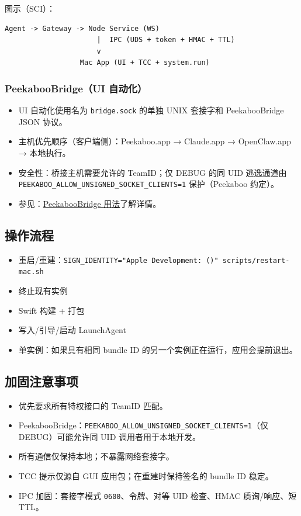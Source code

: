 图示（SCI）：

\begin{lstlisting}
Agent -> Gateway -> Node Service (WS)
                      |  IPC (UDS + token + HMAC + TTL)
                      v
                  Mac App (UI + TCC + system.run)
\end{lstlisting}


\subsubsection{PeekabooBridge（UI 自动化）}


\begin{itemize}
  \item UI 自动化使用名为 \texttt{bridge.sock} 的单独 UNIX 套接字和 PeekabooBridge JSON 协议。
  \item 主机优先顺序（客户端侧）：Peekaboo.app → Claude.app → OpenClaw.app → 本地执行。
  \item 安全性：桥接主机需要允许的 TeamID；仅 DEBUG 的同 UID 逃逸通道由 \texttt{PEEKABOO\_ALLOW\_UNSIGNED\_SOCKET\_CLIENTS=1} 保护（Peekaboo 约定）。
  \item 参见：\href{/platforms/mac/peekaboo}{PeekabooBridge 用法}了解详情。
\end{itemize}


\subsection{操作流程}


\begin{itemize}
  \item 重启/重建：\texttt{SIGN\_IDENTITY="Apple Development:  ()" scripts/restart-mac.sh}
  \item 终止现有实例
  \item Swift 构建 + 打包
  \item 写入/引导/启动 LaunchAgent
  \item 单实例：如果具有相同 bundle ID 的另一个实例正在运行，应用会提前退出。
\end{itemize}


\subsection{加固注意事项}


\begin{itemize}
  \item 优先要求所有特权接口的 TeamID 匹配。
  \item PeekabooBridge：\texttt{PEEKABOO\_ALLOW\_UNSIGNED\_SOCKET\_CLIENTS=1}（仅 DEBUG）可能允许同 UID 调用者用于本地开发。
  \item 所有通信仅保持本地；不暴露网络套接字。
  \item TCC 提示仅源自 GUI 应用包；在重建时保持签名的 bundle ID 稳定。
  \item IPC 加固：套接字模式 \texttt{0600}、令牌、对等 UID 检查、HMAC 质询/响应、短 TTL。
\end{itemize}



